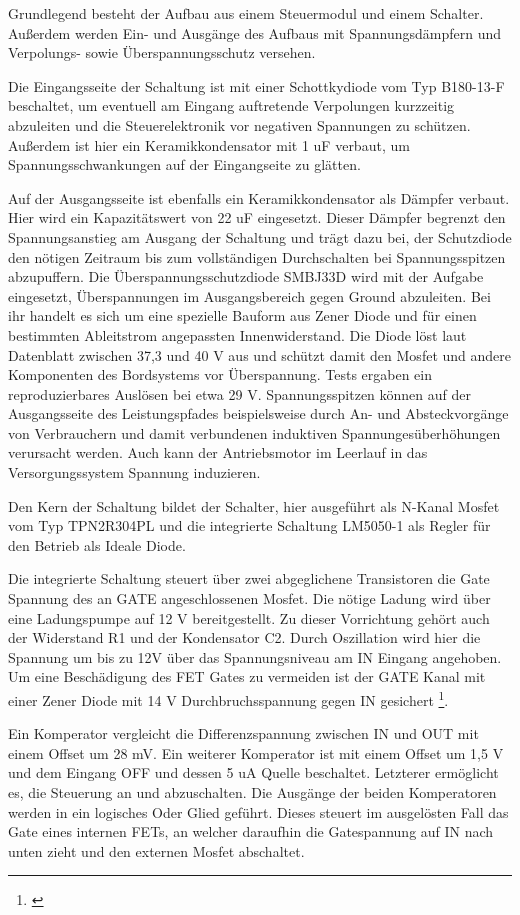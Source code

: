 Grundlegend besteht der Aufbau aus einem Steuermodul und einem Schalter. Außerdem werden Ein- und Ausgänge des Aufbaus mit Spannungsdämpfern und Verpolungs- sowie Überspannungsschutz versehen.

Die Eingangsseite der Schaltung ist mit einer Schottkydiode vom Typ B180-13-F beschaltet, um eventuell am Eingang auftretende Verpolungen kurzzeitig abzuleiten und die Steuerelektronik vor negativen Spannungen zu schützen. Außerdem ist hier ein Keramikkondensator mit 1 uF verbaut, um Spannungsschwankungen auf der Eingangseite zu glätten.

Auf der Ausgangsseite ist ebenfalls ein Keramikkondensator als Dämpfer verbaut. Hier wird ein Kapazitätswert von 22 uF eingesetzt. Dieser Dämpfer begrenzt den Spannungsanstieg am Ausgang der Schaltung und trägt dazu bei, der Schutzdiode den nötigen Zeitraum bis zum vollständigen Durchschalten bei Spannungsspitzen abzupuffern.
Die Überspannungsschutzdiode SMBJ33D wird mit der Aufgabe eingesetzt, Überspannungen im Ausgangsbereich gegen Ground abzuleiten. Bei ihr handelt es sich um eine spezielle Bauform aus Zener Diode und für einen bestimmten Ableitstrom angepassten Innenwiderstand. Die Diode löst laut Datenblatt zwischen 37,3 und 40 V aus und schützt damit den Mosfet und andere Komponenten des Bordsystems vor Überspannung. Tests ergaben ein reproduzierbares Auslösen bei  etwa 29 V. Spannungsspitzen können auf der Ausgangsseite des Leistungspfades beispielsweise durch An- und Absteckvorgänge von Verbrauchern und damit verbundenen induktiven Spannungesüberhöhungen verursacht werden. Auch kann der Antriebsmotor im Leerlauf in das Versorgungssystem Spannung induzieren.

Den Kern der Schaltung bildet der Schalter, hier ausgeführt als N-Kanal Mosfet vom Typ TPN2R304PL und die integrierte Schaltung LM5050-1 als Regler für den Betrieb als Ideale Diode.

Die integrierte Schaltung steuert über zwei abgeglichene Transistoren die Gate Spannung des an GATE angeschlossenen Mosfet. Die nötige Ladung wird über eine Ladungspumpe auf 12 V bereitgestellt. Zu dieser Vorrichtung gehört auch der Widerstand R1 und der Kondensator C2.
Durch Oszillation wird hier die Spannung um bis zu 12V  über das Spannungsniveau am IN Eingang angehoben. Um eine Beschädigung des FET Gates zu vermeiden ist der GATE Kanal mit einer Zener Diode mit 14 V Durchbruchsspannung gegen IN gesichert \footnote{\cite[Seite~12.]{LM5050-1}}.

Ein Komperator vergleicht die Differenzspannung zwischen IN und OUT mit einem Offset um 28 mV. Ein weiterer Komperator ist mit einem Offset um 1,5 V und dem Eingang OFF und dessen 5 uA Quelle beschaltet. Letzterer ermöglicht es, die Steuerung an und abzuschalten. Die Ausgänge der beiden Komperatoren werden in ein logisches Oder Glied geführt. Dieses steuert im ausgelösten Fall das Gate eines internen FETs, an welcher daraufhin die Gatespannung auf IN nach unten zieht und den externen Mosfet abschaltet. 

